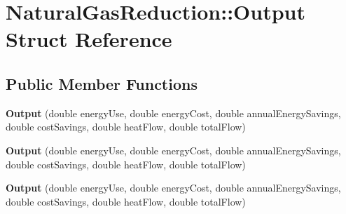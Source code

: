 \hypertarget{struct_natural_gas_reduction_1_1_output}{}\section{Natural\+Gas\+Reduction\+:\+:Output Struct Reference}
\label{struct_natural_gas_reduction_1_1_output}
\subsection*{Public Member Functions}
\begin{DoxyCompactItemize}
\item 
\mbox{\label{struct_natural_gas_reduction_1_1_output_acbe5631bf8a8a78076da8ee5fdf2a59e}} 
{\bfseries Output} (double energy\+Use, double energy\+Cost, double annual\+Energy\+Savings, double cost\+Savings, double heat\+Flow, double total\+Flow)
\item 
\mbox{\label{struct_natural_gas_reduction_1_1_output_acbe5631bf8a8a78076da8ee5fdf2a59e}} 
{\bfseries Output} (double energy\+Use, double energy\+Cost, double annual\+Energy\+Savings, double cost\+Savings, double heat\+Flow, double total\+Flow)
\item 
\mbox{\label{struct_natural_gas_reduction_1_1_output_acbe5631bf8a8a78076da8ee5fdf2a59e}} 
{\bfseries Output} (double energy\+Use, double energy\+Cost, double annual\+Energy\+Savings, double cost\+Savings, double heat\+Flow, double total\+Flow)
\end{DoxyCompactItemize}
